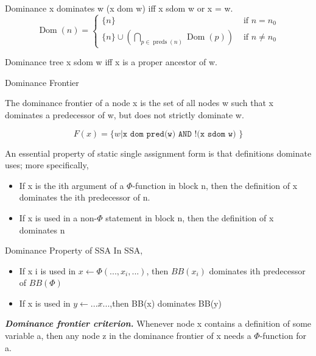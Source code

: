 \begin{definition}{Dominance}
	x  dominates w (x dom w) iff x sdom w or x = w.
	$$
		\operatorname{Dom}(n)= \begin{cases}\{n\} & \text { if } n=n_0 \\ \{n\} \cup\left(\bigcap_{p \in \operatorname{preds}(n)} \operatorname{Dom}(p)\right) & \text { if } n \neq n_0\end{cases}
	$$
\end{definition}

\begin{definition}{Dominance tree}
	x sdom w iff x is a proper ancestor of w.

\end{definition}

\begin{definition}{Dominance Frontier}


	The dominance frontier of a node x is the set of all nodes w such that
	x dominates a predecessor of w, but does not strictly dominate w.

	$$
		F(x)=  \{w | \texttt{x  dom pred(w) AND   !(x  sdom  w) } \}
	$$
\end{definition}





An essential property of static single assignment form is that definitions dominate uses; more specifically,
\begin{itemize}
	\item  If x is the ith argument of a $\Phi$-function in block n, then the definition of x dominates the ith predecessor of n.
	\item  If x is used in a non-$\Phi$ statement in block n, then the definition of x dominates n
\end{itemize}

\begin{note}{Dominance Property of SSA	}
	In SSA,

	\begin{itemize}
		\item If x i is used in $x \leftarrow \Phi (..., x_i , ...)$, then $BB(x_i )$ dominates ith predecessor of $BB(\Phi)$
		\item If x is used in $y \leftarrow ...x...$,then BB(x) dominates BB(y)
	\end{itemize}
\end{note}


\textbf{ \large \textit{Dominance frontier criterion.}} Whenever node x contains a definition of some variable a, then any node z in the dominance frontier of x needs a $\Phi$-function for a.


